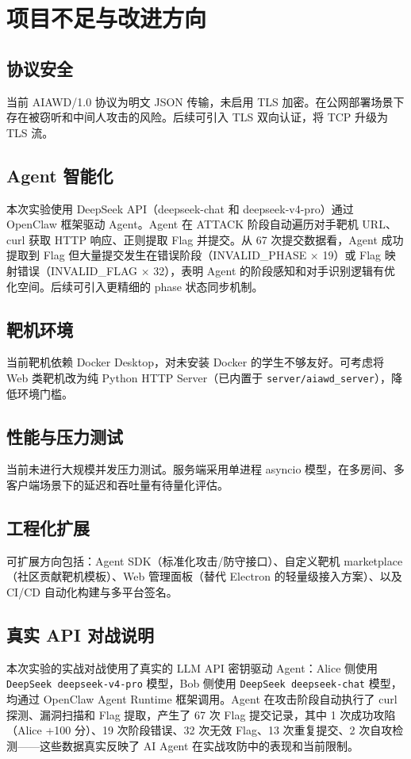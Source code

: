 \documentclass[12pt,a4paper]{ctexbook}
\begin{document}
\chapter{项目不足与改进方向}

\section{协议安全}

当前 AIAWD/1.0 协议为明文 JSON 传输，未启用 TLS 加密。在公网部署场景下存在被窃听和中间人攻击的风险。后续可引入 TLS 双向认证，将 TCP 升级为 TLS 流。

\section{Agent 智能化}

本次实验使用 DeepSeek API（deepseek-chat 和 deepseek-v4-pro）通过 OpenClaw 框架驱动 Agent。Agent 在 ATTACK 阶段自动遍历对手靶机 URL、curl 获取 HTTP 响应、正则提取 Flag 并提交。从 67 次提交数据看，Agent 成功提取到 Flag 但大量提交发生在错误阶段（INVALID\_PHASE × 19）或 Flag 映射错误（INVALID\_FLAG × 32），表明 Agent 的阶段感知和对手识别逻辑有优化空间。后续可引入更精细的 phase 状态同步机制。

\section{靶机环境}

当前靶机依赖 Docker Desktop，对未安装 Docker 的学生不够友好。可考虑将 Web 类靶机改为纯 Python HTTP Server（已内置于 \texttt{server/aiawd\_server}），降低环境门槛。

\section{性能与压力测试}

当前未进行大规模并发压力测试。服务端采用单进程 asyncio 模型，在多房间、多客户端场景下的延迟和吞吐量有待量化评估。

\section{工程化扩展}

可扩展方向包括：Agent SDK（标准化攻击/防守接口）、自定义靶机 marketplace（社区贡献靶机模板）、Web 管理面板（替代 Electron 的轻量级接入方案）、以及 CI/CD 自动化构建与多平台签名。

\section{真实 API 对战说明}

本次实验的实战对战使用了真实的 LLM API 密钥驱动 Agent：Alice 侧使用 \texttt{DeepSeek deepseek-v4-pro} 模型，Bob 侧使用 \texttt{DeepSeek deepseek-chat} 模型，均通过 OpenClaw Agent Runtime 框架调用。Agent 在攻击阶段自动执行了 curl 探测、漏洞扫描和 Flag 提取，产生了 67 次 Flag 提交记录，其中 1 次成功攻陷（Alice +100 分）、19 次阶段错误、32 次无效 Flag、13 次重复提交、2 次自攻检测——这些数据真实反映了 AI Agent 在实战攻防中的表现和当前限制。
\end{document}
